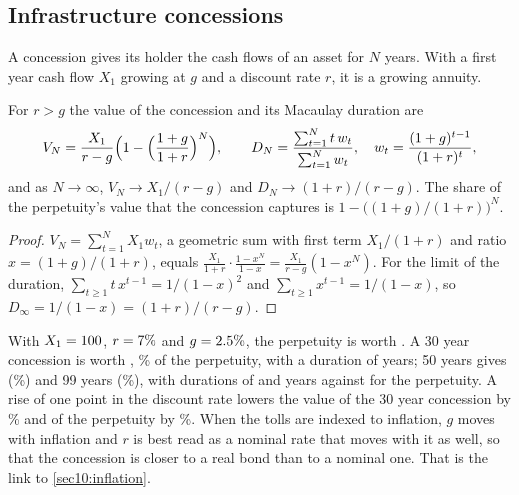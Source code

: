 \begin{chapterrefs}
\subsection{Infrastructure concessions}

A concession gives its holder the cash flows of an asset for $N$ years. With a first year cash flow $X_1$
growing at $g$ and a discount rate $r$, it is a growing annuity.

\begin{proposition}\label{prop10:concession}
For $r>g$ the value of the concession and its Macaulay duration are
\begin{equation}\label{eq10:concession}
  V_N=\frac{X_1}{r-g}\Bigl(1-\Bigl(\frac{1+g}{1+r}\Bigr)^N\Bigr),\qquad
  D_N=\frac{\sum_{t=1}^Nt\,w_t}{\sum_{t=1}^Nw_t},\quad w_t=\frac{(1+g)^{t-1}}{(1+r)^t},
\end{equation}
and as $N\to\infty$, $V_N\to X_1/(r-g)$ and $D_N\to(1+r)/(r-g)$. The share of the perpetuity's value
that the concession captures is $1-\bigl((1+g)/(1+r)\bigr)^N$.
\end{proposition}

\begin{proof}
$V_N=\sum_{t=1}^NX_1w_t$, a geometric sum with first term $X_1/(1+r)$ and ratio $x=(1+g)/(1+r)$, equals
$\frac{X_1}{1+r}\cdot\frac{1-x^N}{1-x}=\frac{X_1}{r-g}(1-x^N)$. For the limit of the duration,
$\sum_{t\ge1}t\,x^{t-1}=1/(1-x)^2$ and $\sum_{t\ge1}x^{t-1}=1/(1-x)$, so $D_\infty=1/(1-x)=(1+r)/(r-g)$.
\end{proof}

With $X_1=100$, $r=7\%$ and $g=2.5\%$, the perpetuity is worth \tbPerp. A 30 year concession
is worth \tbConThirty, \tbShareThirty\% of the perpetuity, with a duration of \tbDurThirty{} years; 50 years
gives \tbConFifty{} (\tbShareFifty\%) and 99 years \tbConNinetyNine{} (\tbShareNinetyNine\%), with durations of
\tbDurFifty{} and \tbDurNinetyNine{} years against \tbDurPerp{} for the perpetuity. A rise of one point in the
discount rate lowers the value of the 30 year concession by \tbShockThirtyAbs\% and of the perpetuity by \tbShockPerpAbs\%. When
the tolls are indexed to inflation, $g$ moves with inflation and $r$ is best read as a nominal rate that
moves with it as well, so that the concession is closer to a real bond than to a nominal one. That is the
link to \cref{sec10:inflation}.

\FloatBarrier

\end{chapterrefs}
